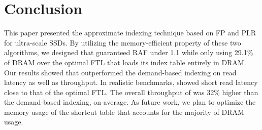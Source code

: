 
\section{Conclusion}
\label{sec:con}

This paper presented the approximate indexing technique
based on FP and PLR for ultra-scale SSDs.  
By utilizing the memory-efficient property 
of these two algorithms, we designed \ours{}
that guaranteed RAF under 1.1 while only using
29.1\% of DRAM over the optimal FTL that loads its index table
entirely in DRAM.
Our results showed that \ours{} outperformed the demand-based indexing
on read latency as well as throughput. In realistic benchmarks,
\ours{} showed short read latency 
close to that of the optimal FTL.
The overall throughput of \ours{} was 32\% higher than 
the demand-based indexing, on average.
As future work, we plan to optimize the memory usage of the shortcut table 
that accounts for the majority of DRAM usage.

\begin{comment}
In write performance, \ours{} performs 20\% lower WAS in average than other 
demand-based FTLs on realistic benchmarks. But, it shows lower 
write throughput (up to 21\% lower) on random write workloads.
\end{comment}

